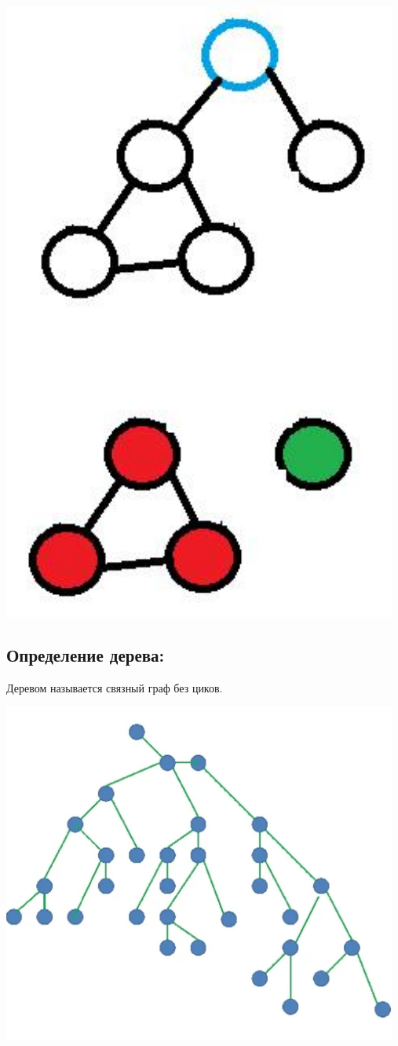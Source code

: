 \documentclass[14pt]{extarticle}
\begin{document}
\begin{center}
    \includegraphics[width=130mm]{"3.11.1.png"}
\end{center}

\subsection{Определение дерева:}

Деревом называется связный граф без циков.

\begin{center}
    \includegraphics[width=130mm]{"3.12.1.png"}
\end{center}
\end{document}
